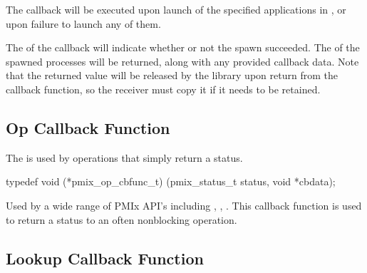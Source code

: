 \begin{arglist}
\end{arglist}


\descr

The callback will be executed upon launch of the specified applications in , or upon failure to launch any of them.

The  of the callback will indicate whether or not the spawn succeeded.
The  of the spawned processes will be returned, along with any provided callback data.
Note that the returned  value will be released by the library upon return from the callback function, so the receiver must copy it if it needs to be retained.


\subsection{Op Callback Function}

\summary

The  is used by operations that simply return a status.

\cspecificstart
\begin{codepar}
typedef void (*pmix_op_cbfunc_t)
    (pmix_status_t status, void *cbdata);
\end{codepar}
\cspecificend

\begin{arglist}
\end{arglist}

\descr

Used by a wide range of \ac{PMIx} API's including , , .
This callback function is used to return a status to an often nonblocking operation.


\subsection{Lookup Callback Function}

\summary

